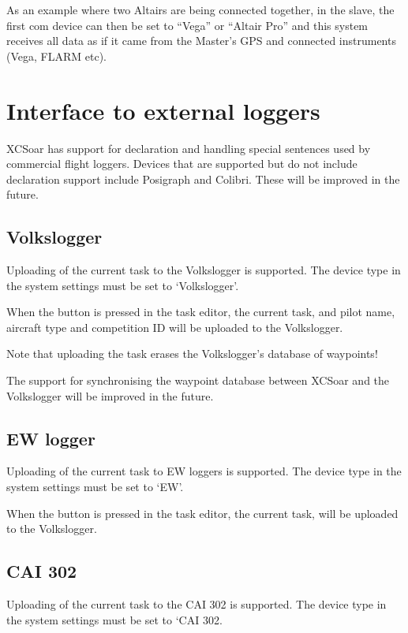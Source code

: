 \documentclass[a4paper,12pt]{refrep}
\begin{document}
As an example where two Altairs are being connected together, in the
slave, the first com device can then be set to ``Vega'' or ``Altair
Pro'' and this system receives all data as if it came from the
Master's GPS and connected instruments (Vega, FLARM etc).

\section{Interface to external loggers}

XCSoar has support for declaration and handling special sentences used
by commercial flight loggers.  Devices that are supported but do not
include declaration support include Posigraph and Colibri.  These will
be improved in the future.

\subsection*{Volkslogger}

Uploading of the current task to the Volkslogger is supported.  The
device type in the system settings must be set to `Volkslogger'.

When the  button is pressed in the task editor, the
current task, and pilot name, aircraft type and competition ID will be
uploaded to the Volkslogger.

Note that uploading the task erases the Volkslogger's database of
waypoints!

The support for synchronising the waypoint database between XCSoar and
the Volkslogger will be improved in the future. 

\subsection*{EW logger}

Uploading of the current task to EW loggers is supported.  The
device type in the system settings must be set to `EW'.

When the  button is pressed in the task editor, the
current task, will be uploaded to the Volkslogger.

\subsection*{CAI 302}

Uploading of the current task to the CAI 302 is supported.  The device
type in the system settings must be set to `CAI 302.
\end{document}
